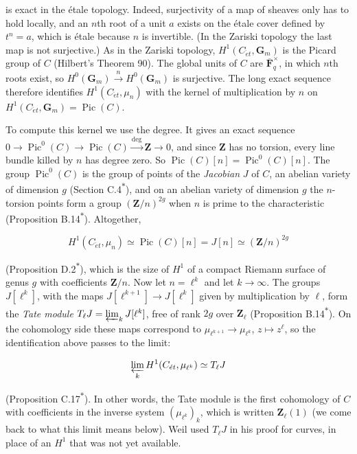 \documentclass[11pt]{article}
\newcommand{\bpout}[1]{#1\textsuperscript{\hyperlink{bp-outside}{\ensuremath{\ast}}}}
\begin{document}
is exact in the étale topology. Indeed, surjectivity of a map of sheaves only has to hold locally, and an \(n\)th root of a unit \(a\) exists on the étale cover defined by \(t^n=a\), which is étale because \(n\) is invertible. (In the Zariski topology the last map is not surjective.) As in the Zariski topology, \(H^1(C_{\acute{e}t},\mathbf G_m)\) is the Picard group of \(C\) (Hilbert's Theorem 90). The global units of \(C\) are \(\overline{\mathbf F}_q^\times\), in which \(n\)th roots exist, so \(H^0(\mathbf G_m)\xrightarrow{n}H^0(\mathbf G_m)\) is surjective. The long exact sequence therefore identifies \(H^1(C_{\acute{e}t},\mu_n)\) with the kernel of multiplication by \(n\) on \(H^1(C_{\acute{e}t},\mathbf G_m)=\operatorname{Pic}(C)\).

To compute this kernel we use the degree. It gives an exact sequence \(0\to\operatorname{Pic}^0(C)\to\operatorname{Pic}(C)\xrightarrow{\deg}\mathbf Z\to0\), and since \(\mathbf Z\) has no torsion, every line bundle killed by \(n\) has degree zero. So \(\operatorname{Pic}(C)[n]=\operatorname{Pic}^0(C)[n]\). The group \(\operatorname{Pic}^0(C)\) is the group of points of the \emph{Jacobian} \(J\) of \(C\), an abelian variety of dimension \(g\) (Section \bpout{C.4}), and on an abelian variety of dimension \(g\) the \(n\)-torsion points form a group \((\mathbf Z/n)^{2g}\) when \(n\) is prime to the characteristic (Proposition \bpout{B.14}). Altogether,

\[
H^1(C_{\acute{e}t},\mu_n)\simeq\operatorname{Pic}(C)[n]=J[n]\simeq(\mathbf Z/n)^{2g}
\]

(Proposition \bpout{D.2}), which is the size of \(H^1\) of a compact Riemann surface of genus \(g\) with coefficients \(\mathbf Z/n\). Now let \(n=\ell^k\) and let \(k\to\infty\). The groups \(J[\ell^k]\), with the maps \(J[\ell^{k+1}]\to J[\ell^k]\) given by multiplication by \(\ell\), form the \emph{Tate module} \(T_\ell J=\varprojlim_kJ[\ell^k]\), free of rank \(2g\) over \(\mathbf Z_\ell\) (Proposition \bpout{B.14}). On the cohomology side these maps correspond to \(\mu_{\ell^{k+1}}\to\mu_{\ell^k}\), \(z\mapsto z^\ell\), so the identification above passes to the limit:

\[
\varprojlim_kH^1(C_{\acute{e}t},\mu_{\ell^k})\simeq T_\ell J
\]

(Proposition \bpout{C.17}). In other words, the Tate module is the first cohomology of \(C\) with coefficients in the inverse system \((\mu_{\ell^k})_k\), which is written \(\mathbf Z_\ell(1)\) (we come back to what this limit means below). Weil used \(T_\ell J\) in his proof for curves, in place of an \(H^1\) that was not yet available.
\end{document}
